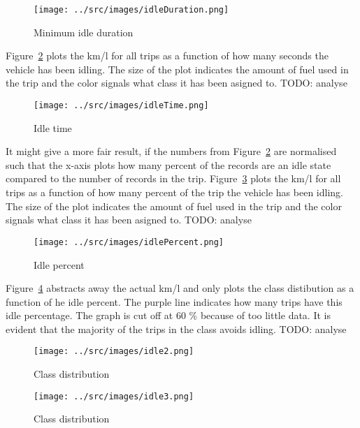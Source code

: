 \begin{figure}[htb] %
\centering
\texttt{[image: ../src/images/idleDuration.png]}
\caption{Minimum idle duration}
\label{fig:idleDuration}
\end{figure}

Figure~\ref{fig:idleTime} plots the km/l for all trips as a function of how many seconds the vehicle has been idling.
The size of the plot indicates the amount of fuel used in the trip and the color signals what class it has been asigned to.
TODO: analyse
\begin{figure}[htb]
\centering
\texttt{[image: ../src/images/idleTime.png]}
\caption{Idle time}
\label{fig:idleTime}
\end{figure}

It might give a more fair result, if the numbers from Figure~\ref{fig:idleTime} are normalised such that the x-axis plots how many percent of the records are an idle state compared to the number of records in the trip.
Figure~\ref{fig:idlePercent} plots the km/l for all trips as a function of how many percent of the trip the vehicle has been idling.
The size of the plot indicates the amount of fuel used in the trip and the color signals what class it has been asigned to.
TODO: analyse
\begin{figure}[htb]
\centering
\texttt{[image: ../src/images/idlePercent.png]}
\caption{Idle percent}
\label{fig:idlePercent}
\end{figure}

Figure~\ref{fig:idleClassPercent} abstracts away the actual km/l and only plots the class distibution as a function of he idle percent. 
The purple line indicates how many trips have this idle percentage. 
The graph is cut off at 60 \% because of too little data.
It is evident that the majority of the trips in the \fuelHigh class avoids idling. 
TODO: analyse

\begin{figure}[htb]
\centering
\texttt{[image: ../src/images/idle2.png]}
\caption{Class distribution }
\label{fig:idleClassPercent}
\end{figure}

\begin{figure}[htb]
\centering
\texttt{[image: ../src/images/idle3.png]}
\caption{Class distribution}
\label{fig:idleClassTime}
\end{figure}

